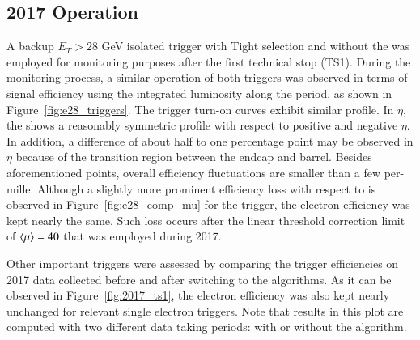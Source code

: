 \subsection{2017 Operation}\label{ssec:2017_ringer_operation}


A backup $E_T > 28$ GeV isolated trigger with Tight selection and without the \rnn{} was employed for
monitoring purposes after the first technical stop (TS1). During the monitoring process, a similar
operation of both triggers was observed in terms of signal efficiency using the
integrated luminosity along the period, as shown in
Figure~\ref{fig:e28_triggers}. The trigger
turn-on curves exhibit similar profile. In $\eta$, the \rnn{} shows a reasonably symmetric
profile with respect to positive and negative $\eta$. In addition, a difference of about half to one percentage point may be observed in $\eta$ because of the transition region between the endcap and barrel. Besides
aforementioned points, overall efficiency fluctuations are smaller than a few
per-mille. Although a slightly more prominent efficiency loss with respect to
\avgmu{} is observed in Figure~\ref{fig:e28_comp_mu} for the \rnn{} trigger, the
electron efficiency was kept nearly the same. Such loss occurs after the
linear threshold correction limit of $\langle \mu \rangle=40$ that was employed during 2017.

Other important triggers were assessed by comparing the trigger efficiencies on
2017 data collected before and after switching to the \rnn{} algorithms.  As it can be observed in Figure~\ref{fig:2017_ts1}, the electron efficiency was also kept nearly unchanged for relevant single electron triggers. Note that results in
this plot are computed with two different data taking periods: with or
without the \rnn{} algorithm. %




